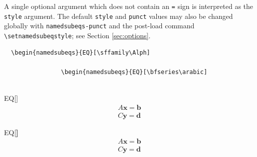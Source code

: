 \documentclass{article}
\begin{document}
A single optional argument which does not contain an \verb|=| sign is interpreted as the \verb|style| argument. The default \verb|style| and \verb|punct| values may also be changed globally with \verb|namedsubeqs-punct| and the post-load command \verb|\setnamedsubeqstyle|; see Section \ref{sec:options}.
\begin{tcolorbox}
  \begin{Verbatim}
  \begin{namedsubeqs}{EQ}[\sffamily\Alph]
  
                \begin{namedsubeqs}{EQ}[\bfseries\arabic]
                
  \end{Verbatim}
\tcblower
  \begin{minipage}[T]{0.4\textwidth}
  	\begin{namedsubeqs}{EQ}[\sffamily\Alph]
    \begin{align}
      A\mathbf{x} = \mathbf{b}   \\
      C\mathbf{y} = \mathbf{d}
    \end{align}
    \end{namedsubeqs}
  \end{minipage}
  \HSKP
  \begin{minipage}[T]{0.4\textwidth}
	  \begin{namedsubeqs}{EQ}[\bfseries\arabic]
	  \begin{align}
	    A\mathbf{x} = \mathbf{b}   \\
	    C\mathbf{y} = \mathbf{d}
	  \end{align}
	  \end{namedsubeqs}
  \end{minipage}
\end{tcolorbox}
\end{document}
